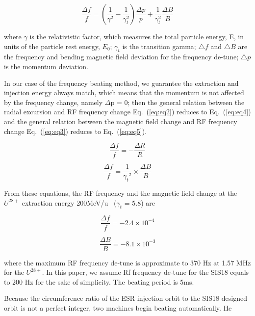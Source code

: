 \begin{equation}
\frac{\Delta{f}}{f} = (\frac{1}{\gamma^2}-\frac{1}{\gamma_t^2})\frac{\Delta{p}}{p}+{\frac{1}{\gamma_t^2}}{\frac{\Delta{B}}{B}}
\label{eq:eq3}
\end{equation}


where $\gamma$ is the relativistic factor, which measures the total particle energy, E, in
units of the particle rest energy, $E_0$; $\gamma_t$ is the transition gamma; $\bigtriangleup{f}$ and  $\bigtriangleup{B}$ are the frequency and  bending magnetic field deviation for the frequency de-tune;  $\bigtriangleup{p}$ is the momentum deviation.

In our case of the frequency beating method, we guarantee the extraction and injection energy always match, which means that the momentum is not affected by the frequency change, namely $\Delta$p = 0; then the general relation between the radial excursion and RF frequency change Eq.~(\ref{eq:eq2}) reduces to Eq.~(\ref{eq:eq4}) and the general relation between the magnetic field change and RF frequency change Eq.~(\ref{eq:eq3}) reduces to Eq.~(\ref{eq:eq5}).

\begin{equation}
\frac{\Delta{f}}{f} = - \frac{\Delta{R}}{R}
\label{eq:eq4}
\end{equation}

\begin{equation}
\frac{\Delta{f}}{f} =  \frac{1}{{\gamma_t}^2}\times{\frac{\Delta{B}}{B}}
\label{eq:eq5}
\end{equation}

From these equations, the RF frequency and the magnetic field change at the $U^{28+}$  extraction energy 200MeV/u~\cite{SIS18_man} ($\gamma_t$ = 5.8) are 

\begin{equation}
\frac{\Delta{f}}{f} = -{2.4}{\times}10^{-4}
\label{eq6}
\end{equation}

\begin{equation}\frac{\Delta{B}}{B} = -{8.1}{\times}10^{-3}\label{eq5}
\end{equation}

where the maximum RF frequency de-tune is approximate to 370 Hz at 1.57 MHz for the $U^{28+}$. In this paper, we assume Rf frequency de-tune for the SIS18 equals to 200 Hz for the sake of simplicity. The beating period is 5ms.


Because the circumference ratio of the ESR injection orbit to the SIS18 designed orbit is not a perfect integer, two machines begin beating automatically. He 


